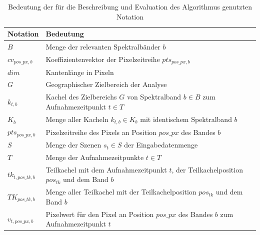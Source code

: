 \begin{table}[H]
          \centering
          \begin{tabular}{| p{2cm} | p{8cm} |}
          	\hline
                  Notation & Bedeutung \\
                  \hline
                  $B$ & Menge der relevanten Spektralbänder $b$ \\
                  \hline
                  $cv_{pos\_px, b}$ & Koeffizientenvektor der Pixelzeitreihe  $pts_{pos\_px, b}$ \\
                  \hline
                  $dim$ & Kantenlänge in Pixeln \\
                  \hline
                  $G$ & Geographischer Zielbereich der Analyse  \\
                  \hline
                  $k_{t, b}$ & Kachel des Zielbereichs $G$ von Spektralband $b \in B$ zum Aufnahmezeitpunkt $t \in T$  \\
                  \hline
                  $K_{b}$ & Menge aller Kacheln $k_{t, b} \in K_b$ mit identischem Spektralband $b$ \\
                  \hline
                  $pts_{pos\_px, b}$ & Pixelzeitreihe des Pixels an Position $pos\_px$ des Bandes $b$ \\
                  \hline
                  $S$ & Menge der Szenen $s_t \in S$ der Eingabedatenmenge \\
                  \hline
		$T$ & Menge der Aufnahmezeitpunkte $t \in T$ \\
                  \hline
                  $tk_{t, pos\_tk, b}$ & Teilkachel mit dem Aufnahmezeitpunkt $t$, der Teilkachelposition $pos_{tk}$ und dem Band $b$ \\
                  \hline
                  $TK_{pos\_tk, b}$ & Menge aller Teilkachel mit der Teilkachelposition $pos_{tk}$ und dem Band $b$ \\
                  \hline
		$v_{t, pos\_px, b}$ & Pixelwert für den Pixel an Position $pos\_px$ des Bandes $b$ zum Aufnahmezeitpunkt $t$ \\
                  \hline

          \end{tabular}
          \caption{Bedeutung der für die Beschreibung und Evaluation des Algorithmus genutzten Notation}
          \label{tab:descriptionNotation}
\end{table}
%

